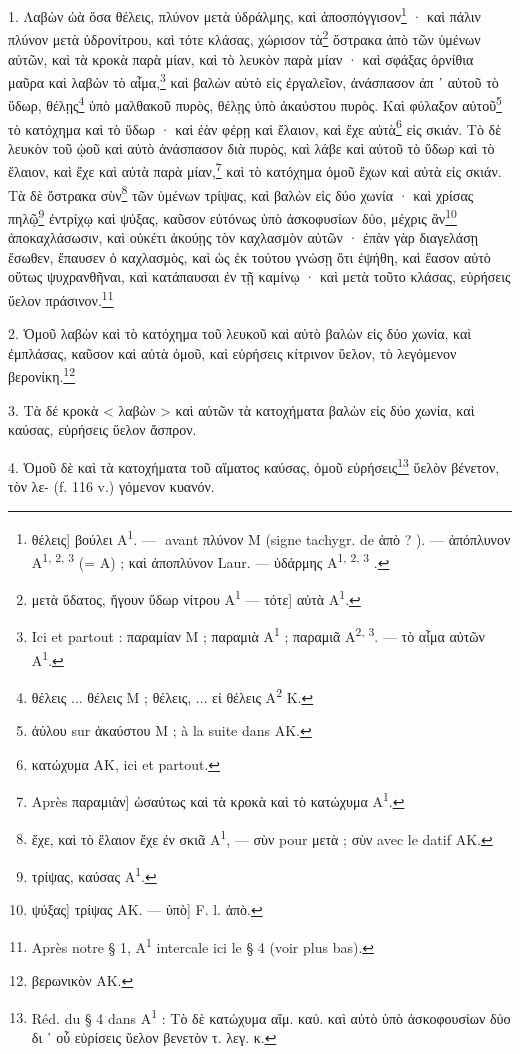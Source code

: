 \documentclass[a4paper, 11pt, oneside, polutonikogreek, french]{article}
\newcommand*\svgB{}
\begin{document}
1. Λαβὼν ὠὰ ὅσα θέλεις, πλύνον μετὰ ὑδράλμης, καὶ ἀποσπόγγισον\footnote{θέλεις] βούλει A\textsuperscript{1}. --- $\svgB$ avant πλύνον M (signe tachygr. de ἀπὸ ? ). --- ἀπόπλυνον A\textsuperscript{1, 2, 3}  (= A) ; καὶ ἀποπλύνον Laur. --- ὑδάρμης A\textsuperscript{1, 2, 3} .} · καὶ πάλιν πλύνον μετὰ ὑδρονίτρου, καὶ τότε κλάσας, χώρισον τὰ\footnote{μετὰ ὕδατος, ἤγουν ὕδωρ νίτρου A\textsuperscript{1} --- τότε] αὐτὰ A\textsuperscript{1}.} ὄστρακα ἀπὸ τῶν ὑμένων αὐτῶν, καὶ τὰ κροκὰ παρὰ μίαν, καὶ τὸ λευκὸν παρὰ μίαν · καὶ σφάξας ὀρνίθια μαῦρα καὶ λαβὼν τὸ αἷμα,\footnote{Ici et partout : παραμίαν M ; παραμιὰ A\textsuperscript{1} ; παραμιᾶ A\textsuperscript{2, 3}. --- τὸ αἷμα αὐτῶν A\textsuperscript{1}.} καὶ βαλὼν αὐτὸ εἰς ἐργαλεῖον, ἀνάσπασον ἀπ ᾽ αὐτοῦ τὸ ὕδωρ, θέλῃς\footnote{θέλεις ... θέλεις M ; θέλεις, ... εἰ θέλεις A\textsuperscript{2} K.} ὑπὸ μαλθακοῦ πυρὸς, θέλῃς ὑπὸ ἀκαύστου πυρὸς. Καὶ φύλαξον αὐτοῦ\footnote{ἀύλου sur ἀκαύστου M ; à la suite dans AK.} τὸ κατόχημα καὶ τὸ ὕδωρ · καὶ ἐὰν φέρῃ καὶ ἔλαιον, καὶ ἔχε αὐτὰ\footnote{κατώχυμα AK, ici et partout.} εἰς σκιάν. Τὸ δὲ λευκὸν τοῦ ᾠοῦ καὶ αὐτὸ ἀνάσπασον διὰ πυρὸς, καὶ λάβε καὶ αὐτοῦ τὸ ὕδωρ καὶ τὸ ἔλαιον, καὶ ἔχε καὶ αὐτὰ παρὰ μίαν,\footnote{Après παραμιὰν] ὡσαύτως καὶ τὰ κροκὰ καὶ τὸ κατώχυμα A\textsuperscript{1}.} καὶ τὸ κατόχημα ὁμοῦ ἔχων καὶ αὐτὰ εἰς σκιάν. Τὰ δὲ ὄστρακα σὺν\footnote{ἔχε, καὶ τὸ ἔλαιον ἔχε ἐν σκιᾶ A\textsuperscript{1}, --- σὺν pour μετὰ ; σὺν avec le datif AK.} τῶν ὑμένων τρίψας, καὶ βαλὼν εἰς δύο χωνία · καὶ χρίσας πηλῷ\footnote{τρίψας, καύσας A\textsuperscript{1}.} ἐντρίχῳ καὶ ψύξας, καῦσον εὐτόνως ὑπὸ ἀσκοφυσίων δύο, μέχρις ἂν\footnote{ψύξας] τρίψας AK. --- ὑπὸ] F. l. ἀπὸ.} ἀποκαχλάσωσιν, καὶ οὐκέτι ἀκούῃς τὸν καχλασμὸν αὐτῶν · ἐπὰν γὰρ διαγελάσῃ ἔσωθεν, ἔπαυσεν ὁ καχλασμὸς, καὶ ὡς ἐκ τούτου γνώσῃ ὅτι ἐψήθη, καὶ ἔασον αὐτὸ οὕτως ψυχρανθῆναι, καὶ κατάπαυσαι ἐν τῇ καμίνῳ · καὶ μετὰ τοῦτο κλάσας, εὑρήσεις ὕελον πράσινον.\footnote{Après notre § 1, A\textsuperscript{1} intercale ici le § 4 (voir plus bas).}

2. Ὁμοῦ λαβὼν καὶ τὸ κατόχημα τοῦ λευκοῦ καὶ αὐτὸ βαλὼν εἰς δύο χωνία, καὶ ἐμπλάσας, καῦσον καὶ αὐτὰ ὁμοῦ, καὶ εὑρήσεις κίτρινον ὕελον, τὸ λεγόμενον βερονίκη.\footnote{βερωνικὸν AK.}

3. Τὰ δέ κροκὰ < λαβὼν > καὶ αὐτῶν τὰ κατοχήματα βαλὼν εἰς δύο χωνία, καὶ καύσας, εὑρήσεις ὕελον ἄσπρον.

4. Ὁμοῦ δὲ καὶ τὰ κατοχήματα τοῦ αἵματος καύσας, ὁμοῦ εὑρήσεις\footnote{Réd. du § 4 dans A\textsuperscript{1} : Τὸ δὲ κατώχυμα αἵμ. καύ. καὶ αὐτὸ ὑπὸ ἀσκοφουσίων δύο δι ᾽ οὗ εὑρίσεις ὕελον βενετὸν τ. λεγ. κ.} ὕελὸν βένετον, τὸν λε- (f. 116 v.) γόμενον κυανόν.
\end{document}
